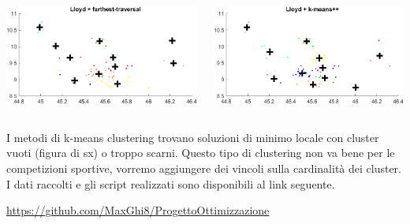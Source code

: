 \documentclass{beamer}
\begin{document}
\begin{frame}
	\begin{columns}
		\begin{column}{0.5\textwidth}
			\begin{center}
				\includegraphics[width=1\textwidth]{lloyd_ft.png}      
			\end{center}
		\end{column}
		\begin{column}{0.5\textwidth}
			\begin{center}
				\includegraphics[width=1\textwidth]{lloyd_kmpp.png}      
			\end{center}
		\end{column}
	\end{columns}
	\vspace{0.5cm}
I metodi di k-means clustering trovano soluzioni di minimo locale con cluster vuoti (figura di sx) o troppo scarni. Questo tipo di clustering non va bene per le competizioni sportive, vorremo aggiungere dei vincoli sulla cardinalità dei cluster. \\
I dati raccolti e gli script realizzati sono disponibili al link seguente.
\begin{center}
	\url{https://github.com/MaxGhi8/ProgettoOttimizzazione}
\end{center}
\end{frame}
\end{document}
